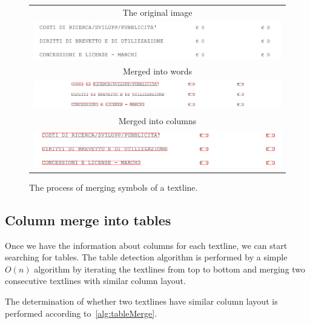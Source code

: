 \begin{figure}
\centering
{\sffamily
\begin{tabular}{c}
The original image \\
\includegraphics[width=0.8\linewidth]{img/implementation/mergedOrig.jpg}\\
Merged into words \\
\includegraphics[width=0.8\linewidth]{img/implementation/mergedWords.png}\\
Merged into columns \\
\includegraphics[width=0.8\linewidth]{img/implementation/mergedCols.png}\\
\end{tabular}
}
\caption{The process of merging symbols of a textline.}
\label{fig:symbolMerging}
\end{figure}

\subsection{Column merge into tables}

Once we have the information about columns for each textline, we can start searching for tables. The table detection algorithm is performed by a simple $O(n)$ algorithm by iterating the textlines from top to bottom and merging two consecutive textlines with similar column layout. 

The determination of whether two textlines have similar column layout is performed according to~\cref{alg:tableMerge}.

